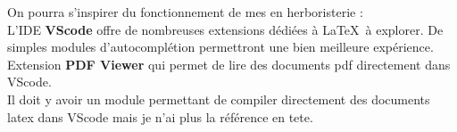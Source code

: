 \documentclass[a4paper,11pt,fleqn]{article}
\begin{document}
On pourra s'inspirer du fonctionnement de mes  en herboristerie : \\

L'IDE \textbf{VScode} offre de nombreuses extensions dédiées à \LaTeX\  à explorer. De simples modules d'autocomplétion permettront une bien meilleure expérience. \\

Extension \textbf{PDF Viewer} qui permet de lire des documents pdf directement dans VScode.\\
Il doit y avoir un module permettant de compiler directement des documents latex dans VScode mais je n'ai plus la référence en tete. 
\end{document}
